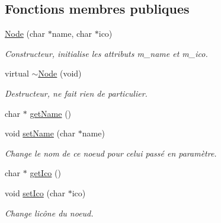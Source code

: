 \subsection*{Fonctions membres publiques}
\begin{DoxyCompactItemize}
\item 
\hyperlink{class_e_p_1_1_node_a9df197a78c36646fba1670935f5ea948}{Node} (char $\ast$name, char $\ast$ico)\hypertarget{class_e_p_1_1_node_a9df197a78c36646fba1670935f5ea948}{}\label{class_e_p_1_1_node_a9df197a78c36646fba1670935f5ea948}

\begin{DoxyCompactList}\small\item\em Constructeur, initialise les attributs m\+\_\+name et m\+\_\+ico. \end{DoxyCompactList}\item 
virtual \hyperlink{class_e_p_1_1_node_a247e246a75f5b7111d53a1e4de19fb0b}{$\sim$\+Node} (void)\hypertarget{class_e_p_1_1_node_a247e246a75f5b7111d53a1e4de19fb0b}{}\label{class_e_p_1_1_node_a247e246a75f5b7111d53a1e4de19fb0b}

\begin{DoxyCompactList}\small\item\em Destructeur, ne fait rien de particulier. \end{DoxyCompactList}\item 
char $\ast$ \hyperlink{class_e_p_1_1_node_ad5dd5dfbe1e26a22de54035a16ddb980}{get\+Name} ()
\item 
void \hyperlink{class_e_p_1_1_node_a27a879726020308b8fd47812ec4a8b86}{set\+Name} (char $\ast$name)
\begin{DoxyCompactList}\small\item\em Change le nom de ce noeud pour celui passé en paramètre. \end{DoxyCompactList}\item 
char $\ast$ \hyperlink{class_e_p_1_1_node_a7e29d725cfe687589f5668c9825fc303}{get\+Ico} ()
\item 
void \hyperlink{class_e_p_1_1_node_a0f1a35a7f9e6d18d38a17b591a130862}{set\+Ico} (char $\ast$ico)
\begin{DoxyCompactList}\small\item\em Change l\textquotesingle{}icône du noeud. \end{DoxyCompactList}\end{DoxyCompactItemize}
